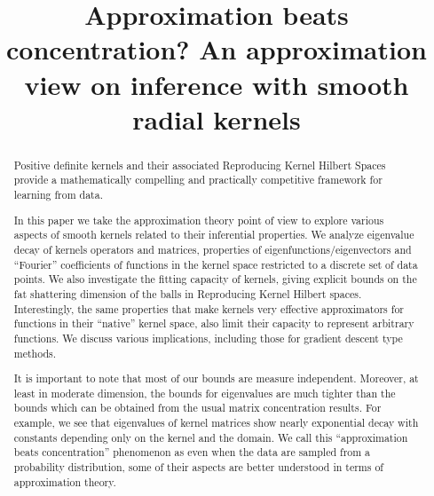 \documentclass[final,12pt]{colt2018}
\title[Approximation beats concentration]{Approximation beats concentration? An approximation view  on inference with smooth radial kernels }
\begin{document}
\setlength{\abovedisplayshortskip}{-.5\baselineskip plus 3pt}
\maketitle



\begin{abstract}


Positive definite kernels and their associated Reproducing Kernel Hilbert Spaces provide a mathematically compelling and practically competitive framework for learning from data. 



In this paper we take the approximation theory point of view to explore various aspects of  smooth kernels related to their inferential properties. We  analyze eigenvalue decay of  kernels operators and  matrices,  properties of eigenfunctions/eigenvectors and ``Fourier'' coefficients of functions in the kernel space restricted to a discrete set of data points.
We also investigate the fitting capacity of kernels,  giving explicit bounds on the fat shattering dimension of the balls in  Reproducing Kernel Hilbert spaces. 
Interestingly, the same properties that make kernels  very effective approximators for functions in their ``native'' kernel space,  also limit their capacity to represent arbitrary functions.  We discuss various implications, including those for gradient descent type methods.

It is important to note that most of our  bounds are measure independent.  Moreover,  at least in moderate dimension, the bounds for eigenvalues are much tighter than the bounds which can be obtained from the usual matrix concentration results. For example, we see that  eigenvalues of kernel matrices show nearly exponential decay with constants depending only on the kernel and the domain. We call this ``approximation beats concentration'' phenomenon as even when the data are sampled from a probability distribution, some of their aspects are better understood in terms of approximation theory. 



%
%
%
%
%



\end{abstract}
\end{document}
